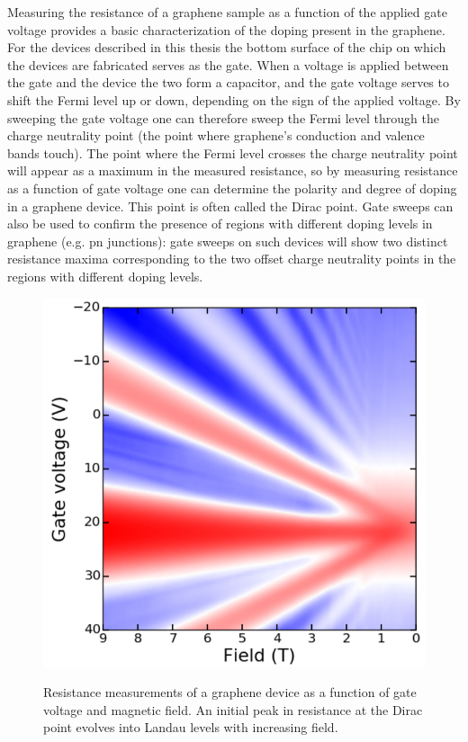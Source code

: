 \documentclass[edeposit,fullpage,draftthesis]{uiucthesis2009}
\begin{document}
            Measuring the resistance of a graphene sample as a function of the applied gate voltage 
            provides a basic characterization of the doping present in the graphene. For the
            devices described in this thesis the bottom surface of the chip on which the devices
            are fabricated serves as the gate.
            When a voltage is applied between the gate and the device the two form a capacitor, and
            the gate voltage serves to shift the Fermi level up or down, depending on the sign of the applied voltage. 
            By sweeping the gate voltage one can therefore sweep
            the Fermi level through the charge neutrality point (the point where graphene's conduction and valence bands touch). 
            The point where the Fermi level crosses the charge neutrality point will appear as a maximum
            in the measured resistance, so by measuring resistance as a function of gate voltage one
            can determine the polarity and degree of doping in a graphene device. This point is often called
            the Dirac point. Gate sweeps can also be used to confirm the presence of regions with different
            doping levels in graphene (e.g. pn junctions): gate sweeps on such devices will show two distinct
            resistance maxima corresponding to the two offset charge neutrality points in the regions with
            different doping levels.
             
            \begin{figure}
                \centering
                \includegraphics[width=0.4\linewidth]{images/experimentaltechniques/landau_levels.png}\\
                \caption[Landau levels in graphene]{
                    Resistance measurements of a graphene device as a function of gate voltage and
                    magnetic field. An initial peak in resistance at the Dirac point evolves into
                    Landau levels with increasing field.
                    }
                \label{fig:landau_levels}
            \end{figure}
            
\end{document}
